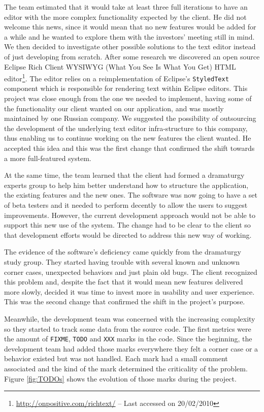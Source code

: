 \documentclass[lnbip]{svmultln}
\begin{document}
The team estimated that it would take at least three full iterations
to have an editor with the more complex functionality expected by the
client. He did not welcome this news, since it would mean that no new
features would be added for a while and he wanted to explore them with
the investors' meeting still in mind.  We then decided to investigate
other possible solutions to the text editor instead of just developing
from scratch. After some research we discovered an open source Eclipse
Rich Client WYSIWYG (What You See Is What You Get) HTML
editor\footnote{\url{http://onpositive.com/richtext/} -- Last accessed
  on 20/02/2010}. The editor relies on a reimplementation of Eclipse's
\texttt{StyledText} component which is responsible for rendering text
within Eclipse editors. This project was close enough from the one we
needed to implement, having some of the functionality our client
wanted on our application, and was mostly maintained by one Russian
company. We suggested the possibility of outsourcing the development
of the underlying text editor infra-structure to this company, thus
enabling us to continue working on the new features the client
wanted. He accepted this idea and this was the first change that
confirmed the shift towards a more full-featured system.

At the same time, the team learned that the client had formed a
dramaturgy experts group to help him better understand how to
structure the application, the existing features and the new ones. The
software was now going to have a set of beta testers and it needed to
perform decently to allow the users to suggest improvements. However,
the current development approach would not be able to support this new
use of the system. The change had to be clear to the client so that
development efforts would be directed to address this new way of
working.

The evidence of the software's deficiency came quickly from the
dramaturgy study group. They started having trouble with several known
and unknown corner cases, unexpected behaviors and just plain old
bugs. The client recognized this problem and, despite the fact that it
would mean new features delivered more slowly, decided it was time to
invest more in usability and user experience. This was the second
change that confirmed the shift in the project's purpose.

Meanwhile, the development team was concerned with the increasing
complexity so they started to track some data from the source
code. The first metrics were the amount of \texttt{FIXME},
\texttt{TODO} and \texttt{XXX} marks in the code. Since the beginning,
the development team had added those marks everywhere they felt a
corner case or a behavior existed but was not handled. Each mark had a
small comment associated and the kind of the mark determined the
criticality of the problem. Figure \ref{fig:TODOs} shows the evolution
of those marks during the project.
\end{document}
